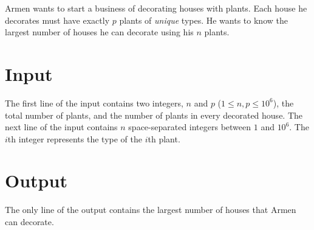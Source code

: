 
Armen wants to start a business of decorating houses with plants.
Each house he decorates must have exactly $p$ plants of \emph{unique} types.
He wants to know the largest number of houses he can decorate using his $n$ plants.

\section*{Input}
The first line of the input contains two integers, $n$ and $p$ ($1 \leq n, p \leq 10^6$), the total number of plants, and the number of plants in every decorated house.
The next line of the input contains $n$ space-separated integers between $1$ and $10^6$.
The $i$th integer represents the type of the $i$th plant.

\section*{Output}
The only line of the output contains the largest number of houses that Armen can decorate.
